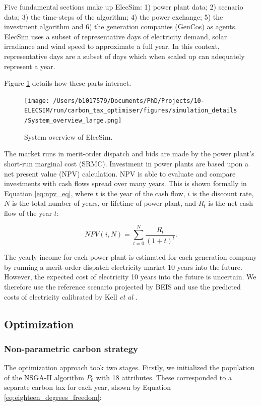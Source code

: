 \documentclass[sigconf]{acmart}
\begin{document}
Five fundamental sections make up ElecSim: 1) power plant data; 2) scenario data; 3) the time-steps of the algorithm; 4) the power exchange; 5) the investment algorithm and 6) the generation companies (GenCos) as agents. ElecSim uses a subset of representative days of electricity demand, solar irradiance and wind speed to approximate a full year. In this context, representative days are a subset of days which when scaled up can adequately represent a year. 

Figure \ref{fig:model_details} details how these parts interact.

\begin{figure}
\centering
\texttt{[image: /Users/b1017579/Documents/PhD/Projects/10-ELECSIM/run/carbon\_tax\_optimiser/figures/simulation\_details/System\_overview\_large.png]}
\caption{System overview of ElecSim.}
\label{fig:model_details}
\end{figure}

The market runs in merit-order dispatch and bids are made by the power plant's short-run marginal cost (SRMC). Investment in power plants are based upon a net present value (NPV) calculation. NPV is able to evaluate and compare investments with cash flows spread over many years. This is shown formally in Equation \ref{eq:npv_eq}, where $t$ is the year of the cash flow, $i$ is the discount rate, $N$ is the total number of years, or lifetime of power plant, and $R_t$ is the net cash flow of the year $t$:

\begin{equation} \label{eq:npv_eq}
NPV(i, N) = \sum_{t=0}^{N}\frac{R_t}{(1+t)^t}.
\end{equation}

The yearly income for each power plant is estimated for each generation company by running a merit-order dispatch electricity market 10 years into the future. However, the expected cost of electricity 10 years into the future is uncertain. We therefore use the reference scenario projected by BEIS and use the predicted costs of electricity calibrated by Kell \textit{et al} \cite{DBEIS2019, Kell2020}.



\subsection{Optimization}
\label{ssec:optimization}
\subsubsection{Non-parametric carbon strategy}
\label{sssec:non_parametric_strategy}
The optimization approach took two stages. Firstly, we initialized the population of the NSGA-II algorithm $P_0$ with 18 attributes. These corresponded to a separate carbon tax for each year, shown by Equation \ref{eq:eighteen_degrees_freedom}:
\end{document}
